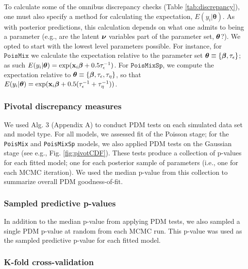 \documentclass[12pt,english]{article}
\begin{document}
\begin{spacing}{1.9}
To calculate some of the omnibus discrepancy checks (Table \ref{tab:discrepancy}), one must also specify a method for calculating the expectation, $E(y_i|\boldsymbol{\theta})$.  As with posterior predictions, this calculation depends on what one admits to being a parameter (e.g., are the latent $\boldsymbol{\nu}$ variables part of the parameter set, $\boldsymbol{\theta}$?).  We opted to start with the lowest level parameters possible.  For instance, for $\texttt{PoisMix}$ we calculate the expectation relative to the parameter set $\boldsymbol{\theta} \equiv \{ \boldsymbol{\beta}, \tau_\epsilon \}$; as such $E(y_i|\boldsymbol{\theta}) = \exp({\bf x}_i \boldsymbol{\beta} + 0.5 \tau_\epsilon^{-1})$.  For $\texttt{PoisMixSp}$, we compute the expectation relative to $\boldsymbol{\theta} \equiv \{ \boldsymbol{\beta}, \tau_\epsilon, \tau_\eta \}$, so that $E(y_i|\boldsymbol{\theta}) = \exp({\bf x}_i \boldsymbol{\beta} + 0.5 (\tau_\epsilon^{-1} + \tau_\eta^{-1}))$.

\subsubsection{Pivotal discrepancy measures}

We used Alg. 3 (Appendix A) to conduct PDM tests on each simulated data set and model type.  For all models, we assessed fit of the Poisson stage; for the \texttt{PoisMix} and \texttt{PoisMixSp} models, we also applied PDM tests on the Gaussian stage (see e.g., Fig. \ref{fig:pivotCDF}).  These tests produce a collection of p-values for each fitted model; one for each posterior sample of parameters (i.e., one for each MCMC iteration).  We used the median p-value from this collection to summarize overall PDM goodness-of-fit.

\subsubsection{Sampled predictive p-values}

In addition to the median p-value from applying PDM tests, we also sampled a single PDM p-value at random from each MCMC run.  This p-value was used as the sampled predictive p-value for each fitted model.

\subsubsection{K-fold cross-validation}


\end{spacing}
\end{document}
